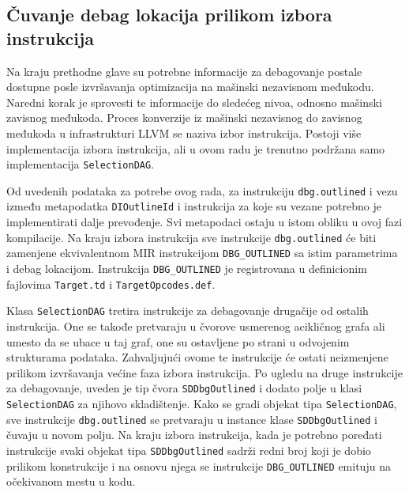 \documentclass[12pt,oneside]{memoir}
\begin{document}
\subsection{Čuvanje debag lokacija prilikom izbora instrukcija}


Na kraju prethodne glave su potrebne informacije za debagovanje postale dostupne posle izvršavanja optimizacija na mašinski nezavisnom međukodu.
Naredni korak je sprovesti te informacije do sledećeg nivoa, odnosno mašinski zavisnog međukoda.
Proces konverzije iz mašinski nezavisnog do zavisnog međukoda u infrastrukturi LLVM se naziva izbor instrukcija.
Postoji više implementacija izbora instrukcija, ali u ovom radu je trenutno podržana samo implementacija \verb|SelectionDAG|.

Od uvedenih podataka za potrebe ovog rada, za instrukciju \verb|dbg.outlined| i vezu između metapodatka \verb|DIOutlineId| i instrukcija za koje su vezane potrebno je implementirati dalje prevođenje.
Svi metapodaci ostaju u istom obliku u ovoj fazi kompilacije.
Na kraju izbora instrukcija sve instrukcije \verb|dbg.outlined| će biti zamenjene ekvivalentnom MIR instrukcijom \verb|DBG_OUTLINED| sa istim parametrima i debag lokacijom.
Instrukcija \verb|DBG_OUTLINED| je registrovana u definicionim fajlovima \verb|Target.td| i \verb|TargetOpcodes.def|.

Klasa \verb|SelectionDAG| tretira instrukcije za debagovanje drugačije od ostalih instrukcija. 
One se takođe pretvaraju u čvorove usmerenog acikličnog grafa ali umesto da se ubace u taj graf, one su ostavljene po strani u odvojenim strukturama podataka. %
Zahvaljujući ovome te instrukcije će ostati neizmenjene prilikom izvršavanja većine faza izbora instrukcija.
Po ugledu na druge instrukcije za debagovanje, uveden je tip čvora \verb|SDDbgOutlined| i dodato polje u klasi \verb|SelectionDAG| za njihovo skladištenje.
Kako se gradi objekat tipa \verb|SelectionDAG|, sve instrukcije \verb|dbg.outlined| se pretvaraju u instance klase \verb|SDDbgOutlined| i čuvaju u novom polju.
Na kraju izbora instrukcija, kada je potrebno poređati instrukcije svaki objekat tipa \verb|SDDbgOutlined| sadrži redni broj koji je dobio prilikom konstrukcije i na osnovu njega se instrukcije \verb|DBG_OUTLINED| emituju na očekivanom mestu u kodu.
\end{document}
